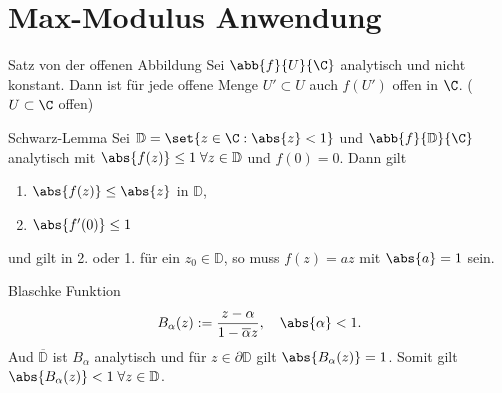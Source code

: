 \section{Max-Modulus Anwendung}

\begin{karte}{Satz von der offenen Abbildung}
    Sei \(\abb{f}{U}{\C}\) analytisch und nicht konstant. Dann ist für jede offene Menge 
    \(U'\subset U\) auch \(f(U')\) offen in \(\C\). (\( U\subset \C \) offen)
\end{karte}

\begin{karte}{Schwarz-Lemma}
    Sei \(\mathbb{D} = \set{z\in \C: \abs{z} < 1}\) und \(\abb{f}{\mathbb{D}}{\C}\) 
    analytisch mit \(\abs{f(z)} \leq 1 \;\forall z\in \mathbb{D}\) und \(f(0) = 0\).
    Dann gilt 
    \begin{enumerate}
        \item \(\abs{f(z)} \leq \abs{z}\) in \(\mathbb{D}\),
        \item \(\abs{f'(0)} \leq 1\)
    \end{enumerate}
    und gilt \gqq{\(=\)} in 2. oder 1. für ein \(z_0 \in \mathbb{D}\), 
    so muss \(f(z) = az\) mit \(\abs{a} = 1\) sein.
\end{karte}

\begin{karte}{Blaschke Funktion}
    \[ B_\alpha(z) := \frac{z - \alpha}{1 - \overline{\alpha} z}, \quad \abs{\alpha} < 1. \]
    Aud \(\overline{\mathbb{D}}\) ist \(B_\alpha\) analytisch und für \(z\in \partial\mathbb{D}\) 
    gilt \(\abs{B_\alpha (z)} = 1\). Somit gilt \(\abs{B_\alpha (z)} < 1 \;\forall z\in \mathbb{D}\).
\end{karte}